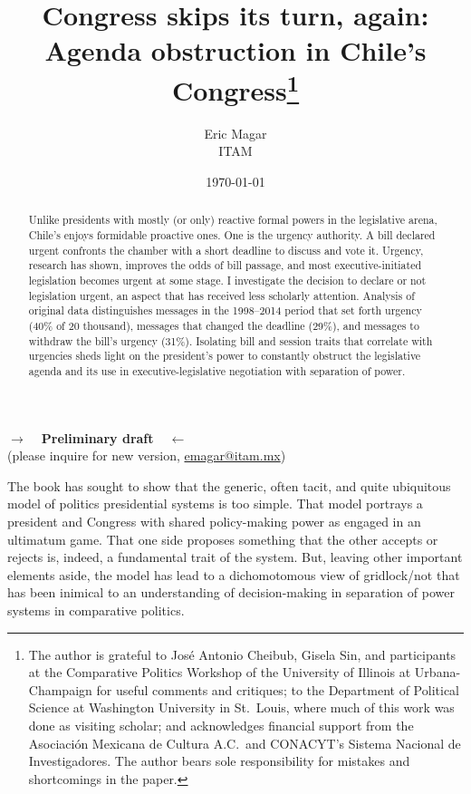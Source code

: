 \documentclass[letter,12pt]{article}
\begin{document}
\title{Congress skips its turn, again: \\ Agenda obstruction in Chile's Congress\thanks{The author is grateful to José Antonio Cheibub, Gisela Sin, and participants at the Comparative Politics Workshop of the University of Illinois at Urbana-Champaign for useful comments and critiques; to the Department of Political Science at Washington University in St.\ Louis, where much of this work was done as visiting scholar; and acknowledges financial support from the Asociaci\'on Mexicana de Cultura A.C.\ and CONACYT's Sistema Nacional de Investigadores. The author bears sole responsibility for mistakes and shortcomings in the paper.}}
\author{Eric Magar \\ ITAM }
\date{\today}
\maketitle

\begin{center} \textbf{$\rightarrow$~~Preliminary draft~~$\leftarrow$} \\ (please inquire for new version, \small{\url{emagar@itam.mx}})  \end{center}

\begin{abstract}
\noindent Unlike presidents with mostly (or only) reactive formal powers in the legislative arena, Chile's enjoys formidable proactive ones. One is the urgency authority. A bill declared urgent confronts the chamber with a short deadline to discuss and vote it. Urgency, research has shown, improves the odds of bill passage, and most executive-initiated legislation becomes urgent at some stage. I investigate the decision to declare or not legislation urgent, an aspect that has received less scholarly attention. Analysis of original data distinguishes messages in the 1998--2014 period that set forth urgency (40\% of 20 thousand), messages that changed the deadline (29\%), and messages to withdraw the bill's urgency (31\%). Isolating bill and session traits that correlate with urgencies sheds light on the president's power to constantly obstruct the legislative agenda and its use in executive-legislative negotiation with separation of power.  
\end{abstract}

\onehalfspacing

The book has sought to show that the generic, often tacit, and quite ubiquitous model of politics presidential systems is too simple. That model portrays a president and Congress with shared policy-making power as engaged in an ultimatum game. That one side proposes something that the other accepts or rejects is, indeed, a fundamental trait of the system. But, leaving other important elements aside, the model has lead to a dichomotomous view of gridlock/not that has been inimical to an understanding of decision-making in separation of power systems in comparative politics.
\end{document}
